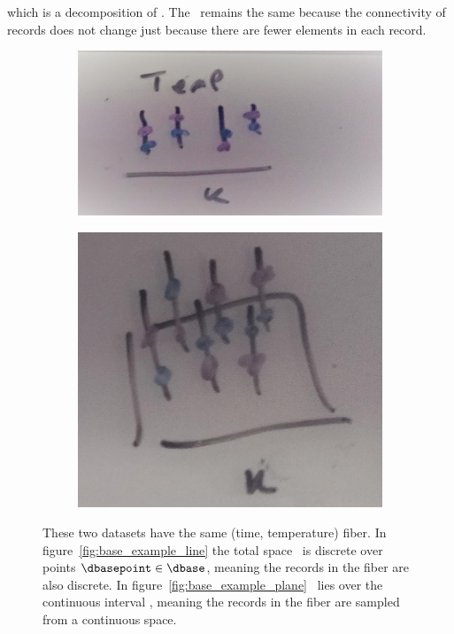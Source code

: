\documentclass[../main.tex]{subfiles}
\begin{document}
which is a decomposition of \dfiber. The \dbase\ remains the same because the connectivity of records does not change just because there are fewer elements in each record.
\begin{figure}[ht!]
    \begin{subfigure}{.5\textwidth}
        \includegraphics[width=\textwidth]{figures/math/temp_1k.png}
        \caption{}
        \label{fig:base_example_discrete}
    \end{subfigure}
    \begin{subfigure}{.5\textwidth}
        \includegraphics[width=\textwidth]{figures/math/temp_2k.png}
        \caption{}
        \label{fig:base_example_continuous}
    \end{subfigure}
    \caption{These two datasets have the same (time, temperature) fiber. In figure~\ref{fig:base_example_line} the total space \dtotal\ is discrete over points $\dbasepoint \in \dbase$, meaning the records in the fiber are also discrete. In figure~\ref{fig:base_example_plane} \dtotal\ lies over the continuous interval \dbase, meaning the records in the fiber are sampled from a continuous space. 
    }
    \label{fig:base_example}
\end{figure}
\end{document}

